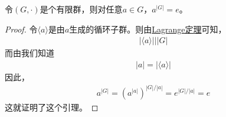 \documentclass[../../main.tex]{subfiles}
\begin{document}
\begin{lemma}\label{lemma:有限群关于元素阶次方的引理}
令$(G, \cdot)$是个有限群，则对任意$a \in G$，$a^{|G|} = e$。
\end{lemma}
\begin{proof}
令$\langle a \rangle$是由$a$生成的循环子群。则由\hyperref[theorem:Lagrange定理]{Lagrange定理}可知，
\begin{align*}
|\langle a \rangle| \Big| |G|
\end{align*}
而由我们知道
\begin{align*}
|a| = |\langle a \rangle|
\end{align*}
因此，
\begin{align*}
a^{|G|} = \left(a^{|a|}\right)^{|G|/|a|} = e^{|G|/|a|} = e
\end{align*}
这就证明了这个引理。
\end{proof}
\end{document}
